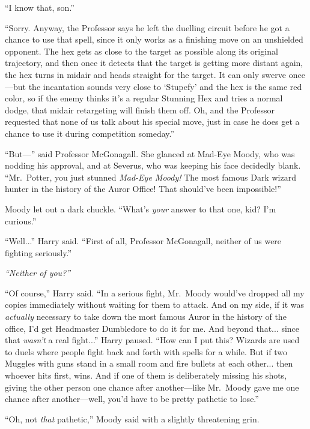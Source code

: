 “I know that, son.”

“Sorry. Anyway, the Professor says he left the duelling circuit before he got a chance to use that spell, since it only works as a finishing move on an unshielded opponent. The hex gets as close to the target as possible along its original trajectory, and then once it detects that the target is getting more distant again, the hex turns in midair and heads straight for the target. It can only swerve once—but the incantation sounds very close to ‘Stupefy’ and the hex is the same red color, so if the enemy thinks it’s a regular Stunning Hex and tries a normal dodge, that midair retargeting will finish them off. Oh, and the Professor requested that none of us talk about his special move, just in case he does get a chance to use it during competition someday.”

“But—” said Professor McGonagall. She glanced at Mad-Eye Moody, who was nodding his approval, and at Severus, who was keeping his face decidedly blank. “Mr.~Potter, you just stunned \emph{Mad-Eye Moody!} The most famous Dark wizard hunter in the history of the Auror Office! That should’ve been impossible!”

Moody let out a dark chuckle. “What’s \emph{your} answer to that one, kid? I’m curious.”

“Well...” Harry said. “First of all, Professor McGonagall, neither of us were fighting seriously.”

\emph{“Neither of you?”}

“Of course,” Harry said. “In a serious fight, Mr.~Moody would’ve dropped all my copies immediately without waiting for them to attack. And on my side, if it was \emph{actually} necessary to take down the most famous Auror in the history of the office, I’d get Headmaster Dumbledore to do it for me. And beyond that... since that \emph{wasn’t} a real fight...” Harry paused. “How can I put this? Wizards are used to duels where people fight back and forth with spells for a while. But if two Muggles with guns stand in a small room and fire bullets at each other... then whoever hits first, wins. And if one of them is deliberately missing his shots, giving the other person one chance after another—like Mr.~Moody gave me one chance after another—well, you’d have to be pretty pathetic to lose.”

“Oh, not \emph{that} pathetic,” Moody said with a slightly threatening grin.

